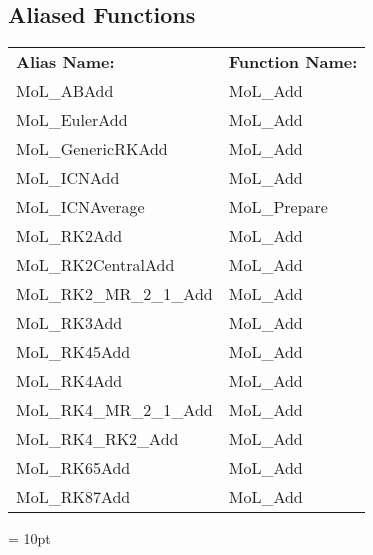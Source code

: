 \subsection*{Aliased Functions}

\hspace{5mm}

 \begin{tabular*}{160mm}{ll} 

{\bf Alias Name:} ~~~~~~~ & {\bf Function Name:} \\ 
MoL\_ABAdd & MoL\_Add \\ 
MoL\_EulerAdd & MoL\_Add \\ 
MoL\_GenericRKAdd & MoL\_Add \\ 
MoL\_ICNAdd & MoL\_Add \\ 
MoL\_ICNAverage & MoL\_Prepare \\ 
MoL\_RK2Add & MoL\_Add \\ 
MoL\_RK2CentralAdd & MoL\_Add \\ 
MoL\_RK2\_MR\_2\_1\_Add & MoL\_Add \\ 
MoL\_RK3Add & MoL\_Add \\ 
MoL\_RK45Add & MoL\_Add \\ 
MoL\_RK4Add & MoL\_Add \\ 
MoL\_RK4\_MR\_2\_1\_Add & MoL\_Add \\ 
MoL\_RK4\_RK2\_Add & MoL\_Add \\ 
MoL\_RK65Add & MoL\_Add \\ 
MoL\_RK87Add & MoL\_Add \\ 
\end{tabular*} 



\vspace{5mm}\parskip = 10pt 
